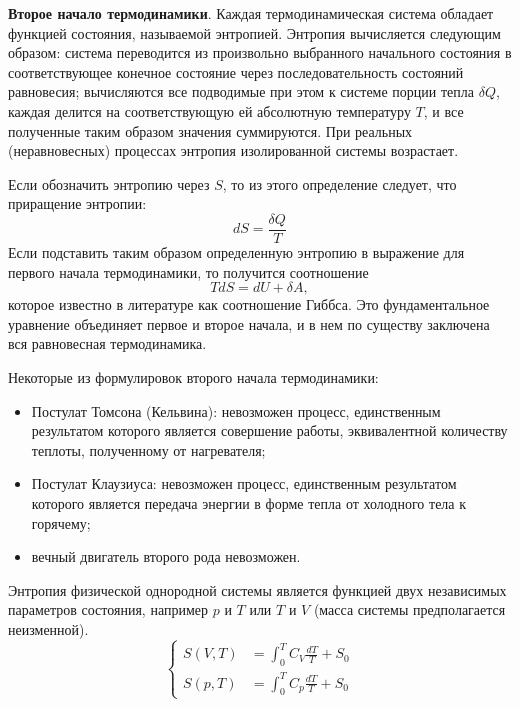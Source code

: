 \documentclass[12pt,a4paper,oneside]{book}
\begin{document}
{\bf Второе начало термодинамики}. Каждая термодинамическая система обладает функцией состояния, называемой энтропией. Энтропия вычисляется следующим образом: система переводится из произвольно выбранного начального состояния в соответствующее конечное состояние через последовательность состояний равновесия; вычисляются все подводимые при этом к системе порции тепла $\delta Q$, каждая делится на соответствующую ей абсолютную температуру $T$, и все полученные таким образом значения суммируются. При реальных (неравновесных) процессах энтропия изолированной системы возрастает.

Если обозначить энтропию через $S$, то из этого определение следует, что приращение энтропии:
\begin{equation}
	d S = \frac{\delta Q}{T}
\end{equation}
Если подставить таким образом определенную энтропию в выражение для первого начала термодинамики, то получится соотношение
\begin{equation}
	T dS = d U + \delta A,
\end{equation}
которое известно в литературе как соотношение Гиббса. Это фундаментальное уравнение объединяет первое и второе начала, и в нем по существу заключена вся равновесная термодинамика.

%

Некоторые из формулировок второго начала термодинамики:
\begin{itemize}
\item[A.] Постулат Томсона (Кельвина): невозможен процесс, единственным результатом которого является совершение работы, эквивалентной количеству теплоты, полученному от нагревателя;
\item[B.] Постулат Клаузиуса: невозможен процесс, единственным результатом которого является передача энергии в форме тепла от холодного тела к горячему;
\item[C.] вечный двигатель второго рода невозможен.
\end{itemize}

Энтропия физической однородной системы является функцией двух независимых параметров состояния, например $p$ и $T$ или $T$ и $V$ (масса системы предполагается неизменной).
\begin{equation}
	\left\lbrace
	\begin{aligned}
		S (V, T) & = \int_0^T C_V \frac{dT}{T} + S_0\\
		S (p, T) & = \int_0^T C_p \frac{dT}{T} + S_0
	\end{aligned}
	\right.
\end{equation}
\end{document}
